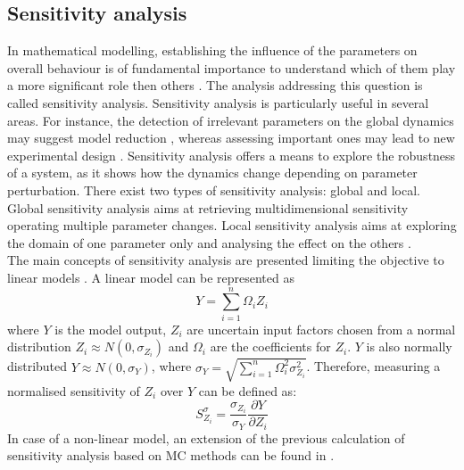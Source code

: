 \subsection{Sensitivity analysis}
\label{subsec:Sensitivity analysis}
In mathematical modelling, establishing the influence of the parameters on overall behaviour is of fundamental importance to understand which of them play a more significant role then others \citep{Aldridge2006}. The analysis addressing this question is called sensitivity analysis. Sensitivity analysis is particularly useful in several areas. For instance, the detection of irrelevant parameters on the global dynamics may suggest model reduction \citep{Jia2008}, whereas assessing important ones may lead to new experimental design \citep{Cho2003}. Sensitivity analysis offers a means to explore the robustness of a system, as it shows how the dynamics change depending on parameter perturbation. There exist two types of sensitivity analysis: global and local. Global sensitivity analysis aims at retrieving multidimensional sensitivity operating multiple parameter changes. Local sensitivity analysis aims at exploring the domain of one parameter only and analysing the effect on the others \citep{Marino2008}.\\
The main concepts of sensitivity analysis are presented limiting the objective to linear models \citep{Saltelli2005}. A linear model can be represented as 
\begin{equation}
   \label{eq:linear_model}
   Y = \sum_{i=1}^{n} \Omega_i Z_i
\end{equation}
where $Y$ is the model output, $Z_i$ are uncertain input factors chosen from a normal distribution $Z_i \approx N(0,\sigma_{Z_i})$ and $\Omega_i$ are the coefficients for $Z_i$. $Y$ is also normally distributed $Y \approx N(0,\sigma_{Y})$, where $\sigma_Y = \sqrt{\sum_{i=1}^{n} \Omega_i^2 \sigma_{Z_i}^2 }$. Therefore, measuring a normalised sensitivity of $Z_i$ over $Y$ can be defined as:
\begin{equation}
  \label{eq:sensitivity_analysis}
  S_{Z_i}^{\sigma} = \frac{\sigma_{Z_i}}{\sigma_{Y}}\frac{\partial Y}{\partial Z_i}
\end{equation}
In case of a non-linear model, an extension of the previous calculation of sensitivity analysis based on MC methods can be found in \citep{Cho2003, Saltelli2005, Saltelli2008}.\\
